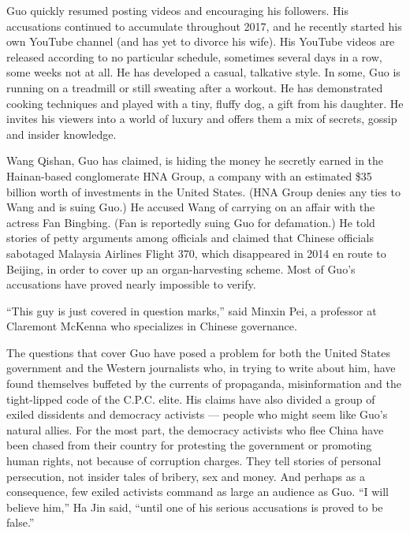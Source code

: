 Guo quickly resumed posting videos and encouraging his followers. His
accusations continued to accumulate throughout 2017, and he recently
started his own YouTube channel (and has yet to divorce his wife). His
YouTube videos are released according to no particular schedule,
sometimes several days in a row, some weeks not at all. He has developed
a casual, talkative style. In some, Guo is running on a treadmill or
still sweating after a workout. He has demonstrated cooking techniques
and played with a tiny, fluffy dog, a gift from his daughter. He invites
his viewers into a world of luxury and offers them a mix of secrets,
gossip and insider knowledge.

Wang Qishan, Guo has claimed, is hiding the money he secretly earned in
the Hainan-based conglomerate HNA Group, a company with an estimated
\$35 billion worth of investments in the United States. (HNA Group
denies any ties to Wang and is suing Guo.) He accused Wang of carrying
on an affair with the actress Fan Bingbing. (Fan is reportedly suing Guo
for defamation.) He told stories of petty arguments among officials and
claimed that Chinese officials sabotaged Malaysia Airlines Flight 370,
which disappeared in 2014 en route to Beijing, in order to cover up an
organ-harvesting scheme. Most of Guo's accusations have proved nearly
impossible to verify.

``This guy is just covered in question marks,'' said Minxin Pei, a
professor at Claremont McKenna who specializes in Chinese governance.

The questions that cover Guo have posed a problem for both the United
States government and the Western journalists who, in trying to write
about him, have found themselves buffeted by the currents of propaganda,
misinformation and the tight-lipped code of the C.P.C. elite. His claims
have also divided a group of exiled dissidents and democracy activists
--- people who might seem like Guo's natural allies. For the most part,
the democracy activists who flee China have been chased from their
country for protesting the government or promoting human rights, not
because of corruption charges. They tell stories of personal
persecution, not insider tales of bribery, sex and money. And perhaps as
a consequence, few exiled activists command as large an audience as Guo.
``I will believe him,'' Ha Jin said, ``until one of his serious
accusations is proved to be false.''

